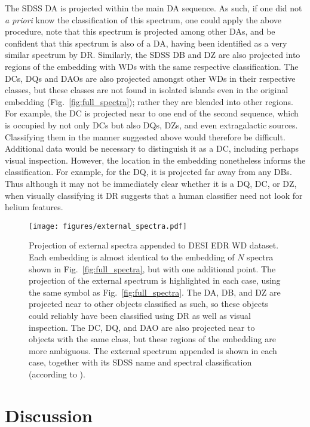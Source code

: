 \documentclass[fleqn,usenatbib]{mnras}
\begin{document}
The SDSS DA is projected within the main DA sequence.
As such, if one did not \textit{a priori} know the classification of this spectrum, one could apply the above procedure, note that this spectrum is projected among other DAs, and be confident that this spectrum is also of a DA, having been identified as a very similar spectrum by DR.
Similarly, the SDSS DB and DZ are also projected into regions of the embedding with WDs with the same respective classification.
The DCs, DQs and DAOs are also projected amongst other WDs in their respective classes, but these classes are not found in isolated islands even in the original embedding (Fig.~\ref{fig:full_spectra}); rather they are blended into other regions.
For example, the DC is projected near to one end of the second sequence, which is occupied by not only DCs but also DQs, DZs, and even extragalactic sources.
Classifying them in the manner suggested above would therefore be difficult.
Additional data would be necessary to distinguish it as a DC, including perhaps visual inspection.
However, the location in the embedding nonetheless informs the classification.
For example, for the DQ, it is projected far away from any DBs.
Thus although it may not be immediately clear whether it is a DQ, DC, or DZ, when visually classifying it DR suggests that a human classifier need not look for helium features.

\begin{figure*}
\texttt{[image: figures/external\_spectra.pdf]}
\caption{
    Projection of external spectra appended to DESI EDR WD dataset.
    Each embedding is almost identical to the embedding of $N$ spectra shown in Fig.~\ref{fig:full_spectra}, but with one additional point.
    The projection of the external spectrum is highlighted in each case, using the same symbol as Fig.~\ref{fig:full_spectra}.
    The DA, DB, and DZ are projected near to other objects classified as such, so these objects could reliably have been classified using DR as well as visual inspection.
    The DC, DQ, and DAO are also projected near to objects with the same class, but these regions of the embedding are more ambiguous.
    The external spectrum appended is shown in each case, together with its SDSS name and spectral classification (according to \citealt{gentilefusillo19}).
}
\label{fig:external_spectra}
\end{figure*}



\section{Discussion}
\label{sec:discussion}
\end{document}
